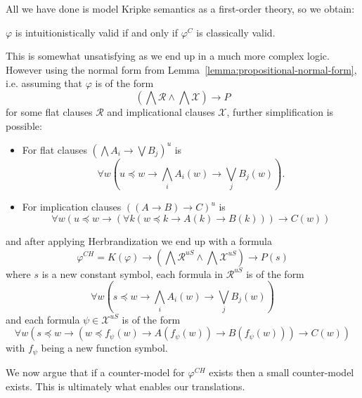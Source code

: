 \documentclass[runningheads]{llncs}
\begin{document}
\noindent All we have done is model Kripke semantics as a first-order theory, so we obtain:

\begin{lemma}
	$\varphi$ is intuitionistically valid if and only if $\varphi^C$ is classically valid.
\end{lemma}

This is somewhat unsatisfying as we end up in a much more complex logic. However using the normal form from Lemma~\ref{lemma:propositional-normal-form}, i.e. assuming that $\varphi$ is of the form $$\left(\bigwedge\mathcal R\wedge\bigwedge\mathcal X\right)\to P$$ for some flat clauses $\mathcal R$ and implicational clauses $\mathcal X$, further simplification is possible:
\begin{itemize}
	\item For flat clauses $(\bigwedge A_i\to\bigvee B_j)^u$ is
	$$\forall w\left(u\preceq w\to\bigwedge_i A_i(w)\to\bigvee_jB_j(w)\right).$$
	\item For implication clauses $((A\to B)\to C)^u$ is
	$$\forall w(u\preceq w\to(\forall k(w\preceq k\to A(k)\to B(k)))\to C(w))$$
\end{itemize}

and after applying Herbrandization we end up with a formula $$\varphi^{CH} = K(\varphi)\to\left(\bigwedge\mathcal R^{uS}\wedge \bigwedge\mathcal X^{uS}\right)\to P(s)$$ where $s$ is a new constant symbol, each formula in $\mathcal R^{uS}$ is of the form
$$\forall w\left(s\preceq w\to\bigwedge_iA_i(w)\to\bigvee_jB_j(w)\right)$$
and each formula $\psi\in\mathcal X^{uS}$ is of the form
$$\forall w(s\preceq w\to(w\preceq f_\psi(w)\to A(f_\psi(w))\to B(f_\psi(w)))\to C(w))$$
with $f_\psi$ being a new function symbol.

We now argue that if a counter-model for $\varphi^{CH}$ exists then a small counter-model exists. This is ultimately what enables our translations.
\end{document}
